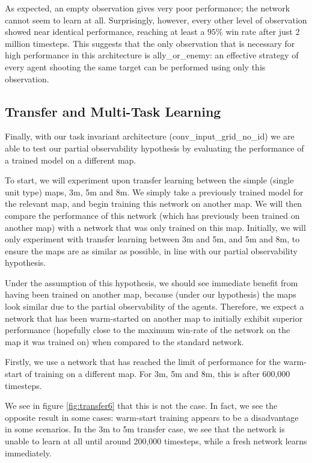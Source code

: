 As expected, an empty observation gives very poor performance; the network cannot seem to learn at all. Surprisingly, however, every other level of observation showed near identical performance, reaching at least a $95\%$ win rate after just 2 million timesteps. This suggests that the only observation that is necessary for high performance in this architecture is ally\_or\_enemy: an effective strategy of every agent shooting the same target can be performed using only this observation.










\subsection{Transfer and Multi-Task Learning}

Finally, with our task invariant architecture (conv\_input\_grid\_no\_id) we are able to test our partial observability hypothesis by evaluating the performance of a trained model on a different map.

To start, we will experiment upon transfer learning between the simple (single unit type) maps, 3m, 5m and 8m. We simply take a previously trained model for the relevant map, and begin training this network on another map. We will then compare the performance of this network (which has previously been trained on another map) with a network that was only trained on this map. Initially, we will only experiment with transfer learning between 3m and 5m, and 5m and 8m, to ensure the maps are as similar as possible, in line with our partial observability hypothesis.

Under the assumption of this hypothesis, we should see immediate benefit from having been trained on another map, because (under our hypothesis) the maps look similar due to the partial observability of the agents. Therefore, we expect a network that has been warm-started on another map to initially exhibit superior performance (hopefully close to the maximum win-rate of the network on the map it was trained on) when compared to the standard network.


Firstly, we use a network that has reached the limit of performance for the warm-start of training on a different map. For 3m, 5m and 8m, this is after 600,000 timesteps.


We see in figure \ref{fig:transfer6} that this is not the case. In fact, we see the opposite result in some cases: warm-start training appears to be a disadvantage in some scenarios. In the 3m to 5m transfer case, we see that the network is unable to learn at all until around 200,000 timesteps, while a fresh network learns immediately.


